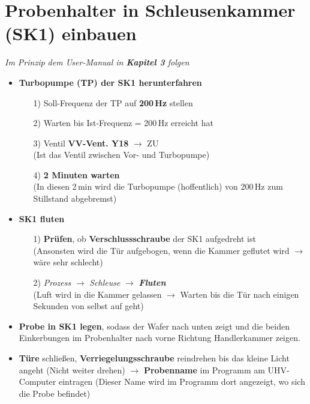 \documentclass[
  ngerman,
  twoside,
  captions=tableheading,
  BCOR=.5cm,
  fontsize=11,
  ]{scrreprt}
\begin{document}
\section{Probenhalter in Schleusenkammer (SK1) einbauen}
\begin{center}
\textit{Im Prinzip dem User-Manual in \textbf{Kapitel 3} folgen}
\end{center}
\begin{itemize}

\item \textbf{Turbopumpe (TP) der SK1 herunterfahren}
\begin{itemize}

\item[1)] Soll-Frequenz der TP auf \textbf{200\,Hz} stellen
\item[2)] Warten bis Ist-Frequenz = 200\,Hz erreicht hat
\item[3)] Ventil \textbf{VV-Vent. Y18} $\rightarrow$ ZU\\
(Ist das Ventil zwischen Vor- und Turbopumpe)
\item[4)] \textbf{2 Minuten warten}\\
(In diesen 2\,min wird die Turbopumpe (hoffentlich) von 200\,Hz zum Stillstand abgebremst)
\end{itemize}

\item \textbf{SK1 fluten}
\begin{itemize}
\item[1)] \textbf{Prüfen}, ob \textbf{Verschlussschraube} der SK1 aufgedreht ist\\
(Ansonsten wird die Tür aufgebogen, wenn die Kammer geflutet wird $\rightarrow$ wäre sehr schlecht)
\item[2)] \textit{Prozess} $\rightarrow$ \textit{Schleuse} $\rightarrow$ \textit{\textbf{Fluten}}\\
(Luft wird in die Kammer gelassen $\rightarrow$ Warten bis die Tür nach einigen Sekunden von selbst auf geht)
\end{itemize}

\item \textbf{Probe in SK1 legen}, sodass der Wafer nach unten zeigt und die beiden Einkerbungen im Probenhalter nach vorne Richtung Handlerkammer zeigen.
\item \textbf{Türe} schließen, \textbf{Verriegelungsschraube} reindrehen bis das kleine Licht angeht (Nicht weiter drehen) $\rightarrow$ \textbf{Probenname} im Programm am UHV-Computer eintragen (Dieser Name wird im Programm dort angezeigt, wo sich die Probe befindet)


\end{itemize}
\end{document}
